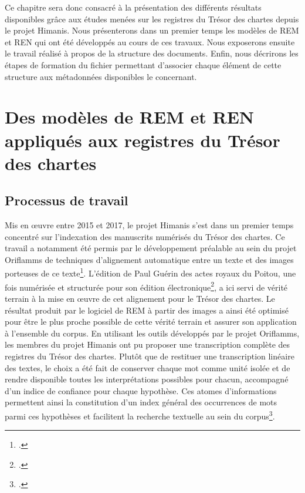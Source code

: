 \documentclass[a4paper,12pt,twoside]{book}
\begin{document}
	Ce chapitre sera donc consacré à la présentation des différents résultats disponibles grâce aux études menées sur les registres du Trésor des chartes depuis le projet Himanis. Nous présenterons dans un premier temps les modèles de REM et REN qui ont été développés au cours de ces travaux. Nous exposerons ensuite le travail réalisé à propos de la structure des documents. Enfin, nous décrirons les étapes de formation du fichier permettant d'associer chaque élément de cette structure aux métadonnées disponibles le concernant.
		
	\section{Des modèles de REM et REN appliqués aux registres du Trésor des chartes}
	
	\subsection{Processus de travail}
	
	Mis en œuvre entre 2015 et 2017, le projet Himanis s'est dans un premier temps concentré sur l'indexation des manuscrits numérisés du Trésor des chartes. Ce travail a notamment été permis par le développement préalable au sein du projet Oriflamms de techniques d'alignement automatique entre un texte et des images porteuses de ce texte\footcite{bluche_automatic_2016}. L'édition de Paul Guérin des actes royaux du Poitou, une fois numérisée et structurée pour son édition électronique\footcite{guerin_actes_1881}, a ici servi de vérité terrain à la mise en œuvre de cet alignement pour le Trésor des chartes. Le résultat produit par le logiciel de REM à partir des images a ainsi été optimisé pour être le plus proche possible de cette vérité terrain et assurer son application à l'ensemble du corpus. En utilisant les outils développés par le projet Oriflamms, les membres du projet Himanis ont pu proposer une transcription complète des registres du Trésor des chartes. Plutôt que de restituer une transcription linéaire des textes, le choix a été fait de conserver chaque mot comme unité isolée et de rendre disponible toutes les interprétations possibles pour chacun, accompagné d'un indice de confiance pour chaque hypothèse. Ces atomes d'informations permettent ainsi la constitution d'un index général des occurrences de mots parmi ces hypothèses et facilitent la recherche textuelle au sein du corpus\footcite{stutzmann_recherche_2017}.
	
\end{document}
